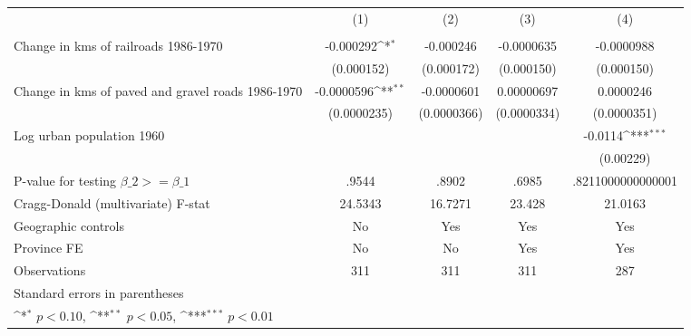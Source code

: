 {
\def\sym#1{\ifmmode^{#1}\else\(^{#1}\)\fi}
\begin{tabular}{l*{4}{c}}
\hline\hline
                &\multicolumn{1}{c}{(1)}&\multicolumn{1}{c}{(2)}&\multicolumn{1}{c}{(3)}&\multicolumn{1}{c}{(4)}\\
                &\multicolumn{1}{c}{}&\multicolumn{1}{c}{}&\multicolumn{1}{c}{}&\multicolumn{1}{c}{}\\
\hline
Change in kms of railroads 1986-1970&-0.000292\sym{*}  &-0.000246         &-0.0000635         &-0.0000988         \\
                &(0.000152)         &(0.000172)         &(0.000150)         &(0.000150)         \\
[1em]
Change in kms of paved and gravel roads 1986-1970&-0.0000596\sym{**} &-0.0000601         &0.00000697         &0.0000246         \\
                &(0.0000235)         &(0.0000366)         &(0.0000334)         &(0.0000351)         \\
[1em]
Log urban population 1960&                  &                  &                  &  -0.0114\sym{***}\\
                &                  &                  &                  &(0.00229)         \\
\hline
P-value for testing $\beta\_{2} >= \beta\_{1}$&    .9544         &    .8902         &    .6985         &.8211000000000001         \\
Cragg-Donald (multivariate) F-stat&  24.5343         &  16.7271         &   23.428         &  21.0163         \\
Geographic controls&       No         &      Yes         &      Yes         &      Yes         \\
Province FE     &       No         &       No         &      Yes         &      Yes         \\
Observations    &      311         &      311         &      311         &      287         \\
\hline\hline
\multicolumn{5}{l}{\footnotesize Standard errors in parentheses}\\
\multicolumn{5}{l}{\footnotesize \sym{*} \(p<0.10\), \sym{**} \(p<0.05\), \sym{***} \(p<0.01\)}\\
\end{tabular}
}
